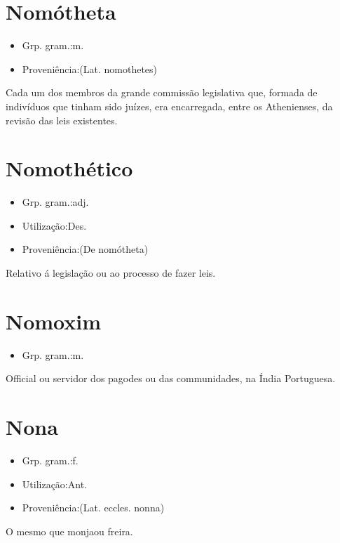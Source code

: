\section{Nomótheta}
\begin{itemize}
\item {Grp. gram.:m.}
\end{itemize}
\begin{itemize}
\item {Proveniência:(Lat. \textunderscore nomothetes\textunderscore )}
\end{itemize}
Cada um dos membros da grande commissão legislativa que, formada de indivíduos que tinham sido juízes, era encarregada, entre os Athenienses, da revisão das leis existentes.
\section{Nomothético}
\begin{itemize}
\item {Grp. gram.:adj.}
\end{itemize}
\begin{itemize}
\item {Utilização:Des.}
\end{itemize}
\begin{itemize}
\item {Proveniência:(De \textunderscore nomótheta\textunderscore )}
\end{itemize}
Relativo á legislação ou ao processo de fazer leis.
\section{Nomoxim}
\begin{itemize}
\item {Grp. gram.:m.}
\end{itemize}
Official ou servidor dos pagodes ou das communidades, na Índia Portuguesa.
\section{Nona}
\begin{itemize}
\item {Grp. gram.:f.}
\end{itemize}
\begin{itemize}
\item {Utilização:Ant.}
\end{itemize}
\begin{itemize}
\item {Proveniência:(Lat. eccles. \textunderscore nonna\textunderscore )}
\end{itemize}
O mesmo que \textunderscore monja\textunderscore  ou \textunderscore freira\textunderscore .
